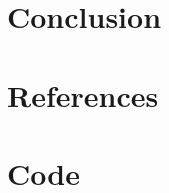 \documentclass[12pt]{article}
\begin{document}
\section{Conclusion}

\section*{References}

\appendix
\section{Code}
\end{document}
